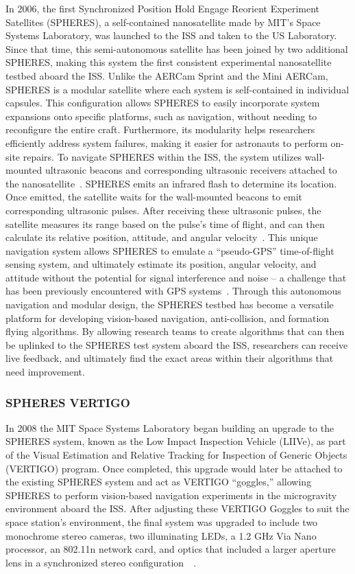\documentclass[onecolumn,10pt]{jhwhw}
\begin{document}
In 2006, the first Synchronized Position Hold Engage Reorient Experiment Satellites (SPHERES), a self-contained nanosatellite made by MIT's Space Systems Laboratory, was launched to the ISS and taken to the US Laboratory. Since that time, this semi-autonomous satellite has been joined by two additional SPHERES, making this system the first consistent experimental nanosatellite testbed aboard the ISS. Unlike the AERCam Sprint and the Mini AERCam, SPHERES is a modular satellite where each system is self-contained in individual capsules. This configuration allows SPHERES to easily incorporate system expansions onto specific platforms, such as navigation, without needing to reconfigure the entire craft. Furthermore, its modularity helps researchers efficiently address system failures, making it easier for astronauts to perform on-site repairs. To navigate SPHERES within the ISS, the system utilizes wall-mounted ultrasonic beacons and corresponding ultrasonic receivers attached to the nanosatellite~\cite{SPHERES}. SPHERES emits an infrared flash to determine its location. Once emitted, the satellite waits for the wall-mounted beacons to emit corresponding ultrasonic pulses. After receiving these ultrasonic pulses, the satellite measures its range based on the pulse's time of flight, and can then calculate its relative position, attitude, and angular velocity~\cite{SPHERES,Vertigo1}. This unique navigation system allows SPHERES to emulate a ``pseudo-GPS'' time-of-flight sensing system, and ultimately estimate its position, angular velocity, and attitude without the potential for signal interference and noise -- a challenge that has been previously encountered with GPS systems~\cite{Vertigo1}. Through this autonomous navigation and modular design, the SPHERES testbed has become a versatile platform for developing vision-based navigation, anti-collision, and formation flying algorithms. By allowing research teams to create algorithms that can then be uplinked to the SPHERES test system aboard the ISS, researchers can receive live feedback, and ultimately find the exact areas within their algorithms that need improvement.

\subsubsection{SPHERES VERTIGO}
In 2008 the MIT Space Systems Laboratory began building an upgrade to the SPHERES system, known as the Low Impact Inspection Vehicle (LIIVe), as part of the Visual Estimation and Relative Tracking for Inspection of Generic Objects (VERTIGO) program. Once completed, this upgrade would later be attached to the existing SPHERES system and act as VERTIGO ``goggles,'' allowing SPHERES to perform vision-based navigation experiments in the microgravity environment aboard the ISS. After adjusting these VERTIGO Goggles to suit the space station's environment, the final system was upgraded to include two monochrome stereo cameras, two illuminating LEDs, a 1.2 GHz Via Nano processor, an 802.11n network card, and optics that included a larger aperture lens in a synchronized stereo configuration~~\cite{SPHERES,Vertigo1,Vertigo2,Vertigo3}.
\end{document}
